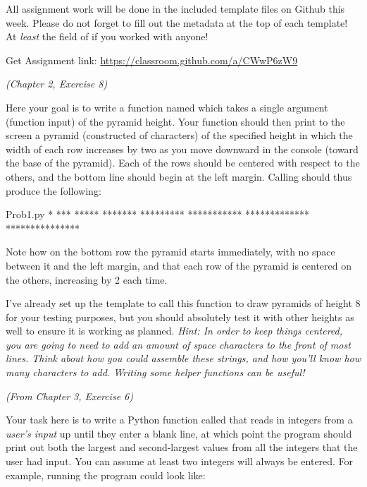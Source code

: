 \documentclass[letterpaper,12pt]{exam}
\begin{document}
All assignment work will be done in the included template files on Github this week. Please do not forget to fill out the metadata at the top of each template! At \emph{least} the field of if you worked with anyone!
	\begin{center}
		Get Assignment link: \url{https://classroom.github.com/a/CWwP6zW9}
	\end{center}
\begin{questions}
	\begin{question}
		\emph{(Chapter 2, Exercise 8)}

		Here your goal is to write a function named  which takes a single argument (function input) of the pyramid height. Your function should then print to the screen a pyramid (constructed of \pyi{*} characters) of the specified height in which the width of each row increases by two as you move downward in the console (toward the base of the pyramid). Each of the rows should be centered with respect to the others, and the bottom line should begin at the left margin. Calling  should thus produce the following:

\begin{termout}{Prob1.py}
	   *
	  ***
	 *****
	*******
   *********
  ***********
 *************
***************
\end{termout}

		Note how on the bottom row the pyramid starts immediately, with no space between it and the left margin, and that each row of the pyramid is centered on the others, increasing by 2 each time.

		I've already set up the template to call this function to draw pyramids of height 8 for your testing purposes, but you should absolutely test it with other heights as well to ensure it is working as planned. \emph{Hint: In order to keep things centered, you are going to need to add an amount of space characters to the front of most lines. Think about how you could assemble these strings, and how you'll know how many characters to add. Writing some helper functions can be useful!} 


	\end{question}

	\newpage
	\begin{question}
		\emph{(From Chapter 3, Exercise 6)}

		Your task here is to write a Python function called  that reads in integers from a \emph{user's input} up until they enter a blank line, at which point the program should print out both the largest and second-largest values from all the integers that the user had input. You can assume at least two integers will always be entered. For example, running the program could look like:


\end{question}
\end{questions}
\end{document}
